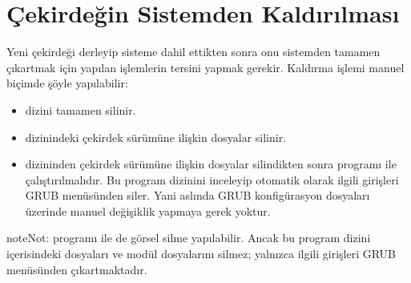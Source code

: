\documentclass[a4paper,10pt,turkish]{sphinxmanual}
\begin{document}
\section{Çekirdeğin Sistemden Kaldırılması}
\label{\detokenize{kernelcompilation:cekirdegin-sistemden-kaldirilmasi}}
\sphinxAtStartPar
Yeni çekirdeği derleyip sisteme dahil ettikten sonra onu sistemden tamamen çıkartmak için yapılan
işlemlerin tersini yapmak gerekir. Kaldırma işlemi manuel biçimde şöyle yapılabilir:
\begin{itemize}
\item {} 
\sphinxAtStartPar
{} dizini tamamen silinir.

\item {} 
\sphinxAtStartPar
{} dizinindeki çekirdek sürümüne ilişkin dosyalar silinir.

\item {} 
\sphinxAtStartPar
{} dizininden çekirdek sürümüne ilişkin dosyalar silindikten sonra  programı
 ile çalıştırılmalıdır. Bu program  dizinini inceleyip otomatik olarak ilgili
girişleri GRUB menüsünden siler. Yani aslında GRUB konfigürasyon dosyaları üzerinde manuel
değişiklik yapmaya gerek yoktur.

\end{itemize}

\begin{sphinxadmonition}{note}{Not:}
\sphinxAtStartPar
{} programı ile de görsel silme yapılabilir. Ancak bu program  dizini
içerisindeki dosyaları ve modül dosyalarını silmez; yalnızca ilgili girişleri GRUB menüsünden
çıkartmaktadır.
\end{sphinxadmonition}
\end{document}
